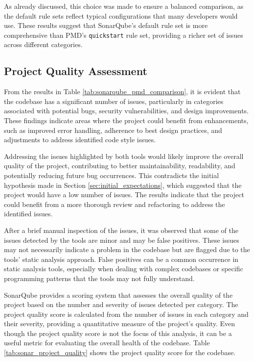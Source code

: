 As already discussed, this choice was made to ensure a balanced comparison, as the default rule sets reflect typical configurations that many developers would use. These results suggest that SonarQube’s default rule set is more comprehensive than PMD’s \texttt{quickstart} rule set, providing a richer set of issues across different categories.

\subsection{Project Quality Assessment}

From the results in Table \ref{tab:sonarqube_pmd_comparison}, it is evident that the codebase has a significant number of issues, particularly in categories associated with potential bugs, security vulnerabilities, and design improvements. These findings indicate areas where the project could benefit from enhancements, such as improved error handling, adherence to best design practices, and adjustments to address identified code style issues.

Addressing the issues highlighted by both tools would likely improve the overall quality of the project, contributing to better maintainability, readability, and potentially reducing future bug occurrences. This contradicts the initial hypothesis made in Section \ref{sec:initial_expectations}, which suggested that the project would have a low number of issues. The results indicate that the project could benefit from a more thorough review and refactoring to address the identified issues.

After a brief manual inspection of the issues, it was observed that some of the issues detected by the tools are minor and may be false positives. These issues may not necessarily indicate a problem in the codebase but are flagged due to the tools' static analysis approach. False positives can be a common occurrence in static analysis tools, especially when dealing with complex codebases or specific programming patterns that the tools may not fully understand.

SonarQube provides a scoring system that assesses the overall quality of the project based on the number and severity of issues detected per category. The project quality score is calculated from the number of issues in each category and their severity, providing a quantitative measure of the project's quality. Even though the project quality score is not the focus of this analysis, it can be a useful metric for evaluating the overall health of the codebase. Table \ref{tab:sonar_project_quality} shows the project quality score for the codebase.

